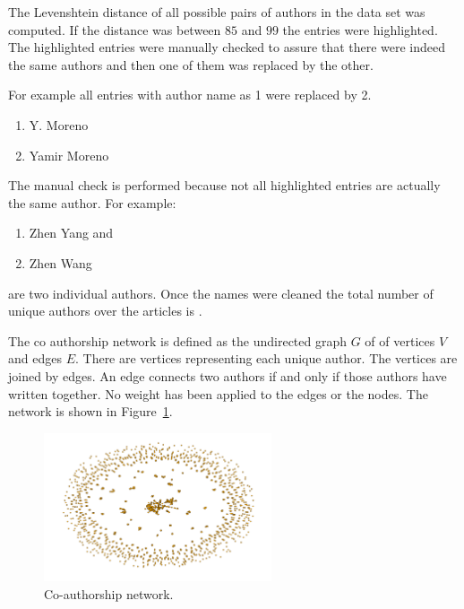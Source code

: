 \documentclass{article}
\newcommand{\uniquetitles}{}
\newcommand{\authors}{}
\newcommand{\edges}{}
\begin{document}
The Levenshtein distance of all possible pairs of authors in the data set was
computed. If the distance was between \(85\) and \(99\) the entries were
highlighted. The highlighted entries were manually checked to assure that there
were indeed the same authors and then one of them was replaced by the other.

For example all entries with author name as 1 were replaced by 2.

\begin{enumerate}
    \item Y. Moreno
    \item Yamir Moreno
\end{enumerate}

The manual check is performed because not all highlighted entries are actually the
same author. For example:

\begin{enumerate}
    \item Zhen Yang and
    \item Zhen Wang
\end{enumerate}

are two individual authors. Once the names were cleaned the total number of
unique authors over the \uniquetitles articles is \authors.

The co authorship network is defined as the undirected graph \(G\) of of vertices \(V\)
and edges \(E\). There are \authors vertices representing each unique
author.
The vertices are joined by \edges edges. An edge connects two authors
if and only if those authors have written together. No weight has been applied to
the edges or the nodes. The network is shown in Figure~\ref{fig:authors_network}.

\begin{figure}[!hbtp]
    \centering
    \includegraphics[width=0.6\textwidth]{./assets/images/co-authors-network.pdf}
    \caption{Co-authorship network.}\label{fig:authors_network}
\end{figure}
\end{document}
